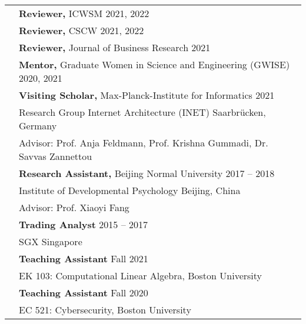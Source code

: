 \documentclass[letterpaper, 11pt]{article}
\begin{document}
\begin{longtable}{p{1.3in}p{4.8in}}
{\color{OliveGreen}{Service}} 
& \textbf{Reviewer, }{ICWSM} \hfill 2021, 2022 \\
& \textbf{Reviewer, }{CSCW} \hfill 2021, 2022 \\
& \textbf{Reviewer, }{Journal of Business Research} \hfill 2021 \\
& \textbf{Mentor, }{Graduate Women in Science and Engineering (GWISE)} \hfill 2020, 2021\\


\color{OliveGreen}{Experience} 
& \textbf{Visiting Scholar,} Max-Planck-Institute for Informatics \hfill 2021 \\ 
& Research Group Internet Architecture (INET) \hfill Saarbrücken, Germany \\
& Advisor: Prof. Anja Feldmann, Prof. Krishna Gummadi, Dr. Savvas Zannettou\\

& \textbf{Research Assistant,} Beijing Normal University \hfill 2017 -- 2018 \\
& Institute of Developmental Psychology \hfill Beijing, China\\
& Advisor: Prof. Xiaoyi Fang\\

& \textbf{Trading Analyst} \hfill 2015 -- 2017 \\
& SGX \hfill Singapore\\


{\color{OliveGreen}{Teaching}} 
& \textbf{Teaching Assistant } \hfill Fall 2021 \\
& EK 103: Computational Linear Algebra, Boston University \\

& \textbf{Teaching Assistant } \hfill Fall 2020 \\
& EC 521: Cybersecurity, Boston University \\




\end{longtable}
\end{document}
